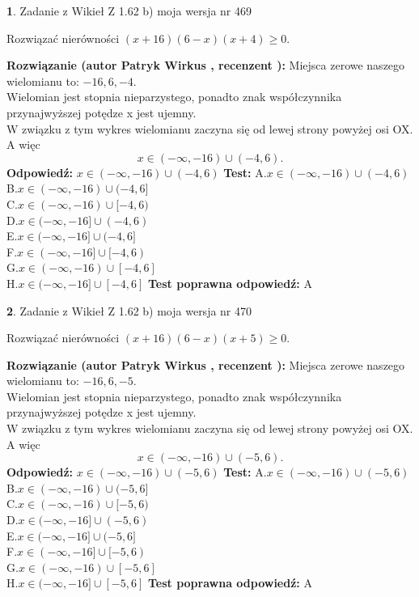 \documentclass[12pt, a4paper]{article}
\theoremstyle{definition} %
\newtheorem{zad}{}
\newcommand{\zadStart}[1]{\begin{zad}#1\newline}
\newcommand{\zadStop}{\end{zad}}
\newcommand{\rozwStart}[2]{\noindent \textbf{Rozwiązanie (autor #1 , recenzent #2): }\newline}
\newcommand{\rozwStop}{\newline}
\newcommand{\odpStart}{\noindent \textbf{Odpowiedź:}\newline}
\newcommand{\odpStop}{\newline}
\newcommand{\testStart}{\noindent \textbf{Test:}\newline}
\newcommand{\testStop}{\newline}
\newcommand{\kluczStart}{\noindent \textbf{Test poprawna odpowiedź:}\newline}
\newcommand{\kluczStop}{\newline}
\begin{document}
\zadStart{Zadanie z Wikieł Z 1.62 b) moja wersja nr 469}

Rozwiązać nierówności $(x+16)(6-x)(x+4)\ge0$.
\zadStop
\rozwStart{Patryk Wirkus}{}
Miejsca zerowe naszego wielomianu to: $-16, 6, -4$.\\
Wielomian jest stopnia nieparzystego, ponadto znak współczynnika przy\linebreak najwyższej potędze x jest ujemny.\\ W związku z tym wykres wielomianu zaczyna się od lewej strony powyżej osi OX. A więc $$x \in (-\infty,-16) \cup (-4,6).$$
\rozwStop
\odpStart
$x \in (-\infty,-16) \cup (-4,6)$
\odpStop
\testStart
A.$x \in (-\infty,-16) \cup (-4,6)$\\
B.$x \in (-\infty,-16) \cup (-4,6]$\\
C.$x \in (-\infty,-16) \cup [-4,6)$\\
D.$x \in (-\infty,-16] \cup (-4,6)$\\
E.$x \in (-\infty,-16] \cup (-4,6]$\\
F.$x \in (-\infty,-16] \cup [-4,6)$\\
G.$x \in (-\infty,-16) \cup [-4,6]$\\
H.$x \in (-\infty,-16] \cup [-4,6]$
\testStop
\kluczStart
A
\kluczStop



\zadStart{Zadanie z Wikieł Z 1.62 b) moja wersja nr 470}

Rozwiązać nierówności $(x+16)(6-x)(x+5)\ge0$.
\zadStop
\rozwStart{Patryk Wirkus}{}
Miejsca zerowe naszego wielomianu to: $-16, 6, -5$.\\
Wielomian jest stopnia nieparzystego, ponadto znak współczynnika przy\linebreak najwyższej potędze x jest ujemny.\\ W związku z tym wykres wielomianu zaczyna się od lewej strony powyżej osi OX. A więc $$x \in (-\infty,-16) \cup (-5,6).$$
\rozwStop
\odpStart
$x \in (-\infty,-16) \cup (-5,6)$
\odpStop
\testStart
A.$x \in (-\infty,-16) \cup (-5,6)$\\
B.$x \in (-\infty,-16) \cup (-5,6]$\\
C.$x \in (-\infty,-16) \cup [-5,6)$\\
D.$x \in (-\infty,-16] \cup (-5,6)$\\
E.$x \in (-\infty,-16] \cup (-5,6]$\\
F.$x \in (-\infty,-16] \cup [-5,6)$\\
G.$x \in (-\infty,-16) \cup [-5,6]$\\
H.$x \in (-\infty,-16] \cup [-5,6]$
\testStop
\kluczStart
A
\kluczStop
\end{document}

